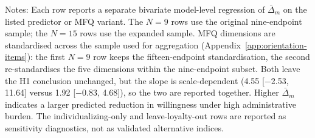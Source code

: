 \documentclass[11pt]{article}
\begin{document}
\begin{table}[htbp]
\centering
\caption{H1 robustness across original and expanded model samples}
\label{tab:h1_expanded_robustness}
\begin{flushleft}
\footnotesize Notes: Each row reports a separate bivariate model-level regression of \(\bar{\Delta}_m\) on the listed predictor or MFQ variant. The \(N=9\) rows use the original nine-endpoint sample; the \(N=15\) rows use the expanded sample. MFQ dimensions are standardised across the sample used for aggregation (Appendix~\ref{app:orientation-items}): the first \(N=9\) row keeps the fifteen-endpoint standardisation, the second re-standardises the five dimensions within the nine-endpoint subset. Both leave the H1 conclusion unchanged, but the slope is scale-dependent (4.55 [$-$2.53, 11.64] versus 1.92 [$-$0.83, 4.68]), so the two are reported together. Higher \(\bar{\Delta}_m\) indicates a larger predicted reduction in willingness under high administrative burden. The individualizing-only and leave-loyalty-out rows are reported as sensitivity diagnostics, not as validated alternative indices.
\end{flushleft}
\end{table}
\end{document}

